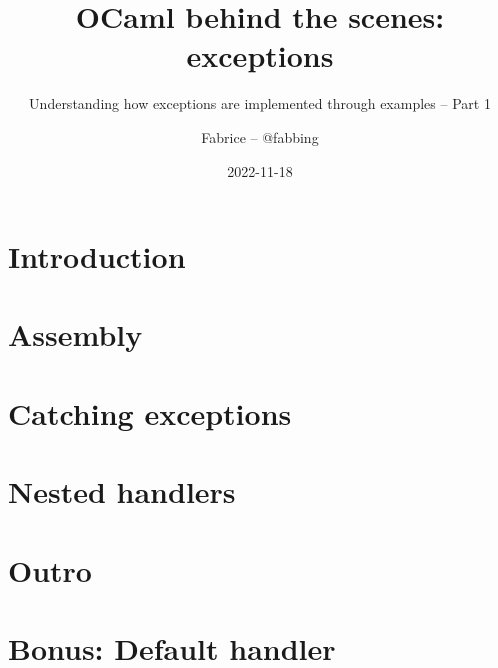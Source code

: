 \documentclass[aspectratio=169,usenames,dvipsnames,8pt,compress]{beamer}
\title[OBTS: exceptions]{OCaml behind the scenes: exceptions}
\subtitle{Understanding how exceptions are implemented through examples -- Part 1}
\author{Fabrice -- @fabbing}
\institute{Tarides}
\date{2022-11-18}
\begin{document}
\newcommand{\funcname}[1]{%
\texttt{\textcolor{RoyalBlue}{#1}}%
}

\newcommand{\funcarg}[1]{%
\texttt{\textcolor{Periwinkle}{#1}}%
}

\newcommand{\localname}[1]{%
\texttt{\textcolor{Periwinkle}{#1}}%
}

\newcommand{\typename}[1]{%
\texttt{\textcolor{BrickRed}{#1}}%
}

\newcommand{\regname}[1]{%
  \texttt{\textcolor{Periwinkle}{$\langle$#1$\rangle$}}%
}





\newcommand\frameSubsection[2]{
\begin{frame}
\vfill
\centering
\begin{beamercolorbox}[sep=8pt,center,shadow=true,rounded=true]{title}
  \usebeamerfont{title}\insertsectionhead\par%
  \smallskip
  \usebeamerfont{subtitle}\insertsubsectionhead\par%
\end{beamercolorbox}
\ifthenelse{\equal{#1}{}}{}{
  \smallskip
  \begin{figure}
    \texttt{[image: \#1]}
    \ifthenelse{\equal{#2}{}}{}{
      \caption*{#2}
    }
  \end{figure}
}
\vfill
\end{frame}
}

\newcommand\frameSubsectionTakeaway{%
\frameSubsection{pictures/Trinity.png}{}%
}


\begin{frame}
  \titlepage
\end{frame}

\section*{Introduction}


\section{Assembly}


\section{Catching exceptions}


\section{Nested handlers}


\section*{Outro}


\section*{Bonus: Default handler}



%

\end{document}
